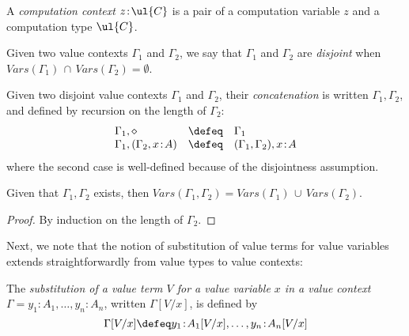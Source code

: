 \begin{definition}
A \emph{computation context} $z \!:\! \ul{C}$ is a pair of a computation variable $z$ and a computation type $\ul{C}$.
\end{definition}

\begin{definition}
Given two value contexts $\Gamma_1$ and $\Gamma_2$, we say that $\Gamma_1$ and $\Gamma_2$ are \emph{disjoint} when $V\!ars(\Gamma_1) \,\cap\, V\!ars(\Gamma_2) = \emptyset$.
\end{definition}

\begin{definition}
Given two disjoint value contexts $\Gamma_1$ and $\Gamma_2$, their \emph{concatenation} is written $\Gamma_1,\Gamma_2$, and defined by recursion on the length of $\Gamma_2$:
\[
\begin{array}{l c l}
\Gamma_1,\diamond & \defeq & \Gamma_1
\\
\Gamma_1, (\Gamma_2,x \!:\! A) & \defeq & (\Gamma_1,\Gamma_2), x \!:\! A
\end{array}
\]
where the second case is well-defined because of the disjointness assumption.
\end{definition}

\begin{proposition}
\label{prop:unionofvariablesinconctexts}
Given that $\Gamma_1,\Gamma_2$ exists, then $V\!ars(\Gamma_1,\Gamma_2) = V\!ars(\Gamma_1) \,\cup\, V\!ars(\Gamma_2)$.
\end{proposition}

\begin{proof}
By induction on the length of $\Gamma_2$.
\end{proof}


Next, we note that the notion of substitution of value terms for value variables extends straightforwardly from value types to value contexts:

\begin{definition}
\label{def:contextsubstitution}
The \emph{substitution of a value term $V$ for a value variable $x$ in a value context $\Gamma = y_1 \!:\! A_1, \ldots, y_n \!:\! A_n$}, written $\Gamma[V/x]$, is defined by 
\[
\Gamma[V/x] \defeq y_1 \!:\! A_1[V/x], \ldots, y_n \!:\! A_n[V/x]
\]
\end{definition}

